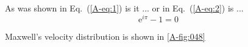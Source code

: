 \documentclass{article}
\begin{document}
As was shown in Eq.~(\ref{A-eq:1}) is it
  ... or in Eq.~(\ref{A-eq:2}) is ...
  \begin{equation}
    \mathrm{e}^{i\pi}-1=0 \label{eq:x}
  \end{equation}

  Maxwell's velocity distribution is shown in \ref{A-fig:048}
\end{document}
